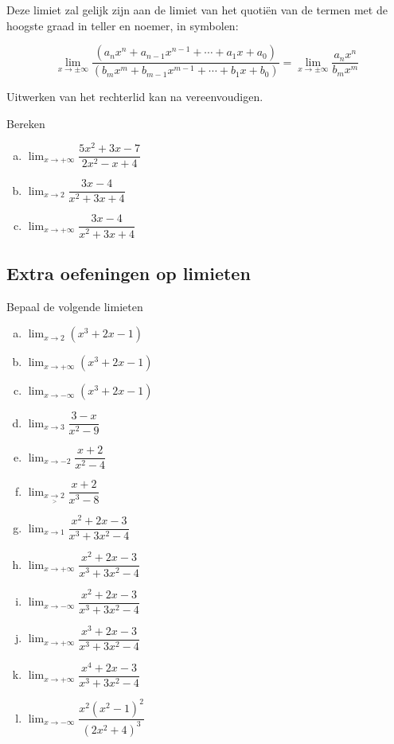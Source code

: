 \documentclass[12pt,twoside,a4paper]{article}
\newenvironment{eigenschap}
{
  \vspace{0.4cm}
  \begin{mdframed}[nobreak=true,frametitle={Eigenschap}]
  }{%
  \end{mdframed}
}
\begin{document}
Deze limiet zal gelijk zijn aan de limiet van het quotiën van de termen met de hoogste graad in teller en noemer, in symbolen:

\begin{eigenschap}
  $$\lim_{x\to \pm\infty}\dfrac{\left(a_nx^n+a_{n-1}x^{n-1}+\cdots+a_1x+a_0\right)}{\left(b_mx^m+b_{m-1}x^{m-1}+\cdots+b_1x+b_0\right)}=\lim_{x\to \pm\infty}\dfrac{a_nx^n}{b_mx^m}$$
\end{eigenschap}

Uitwerken van het rechterlid kan na vereenvoudigen.

\begin{oefening}
  Bereken
  \begin{enumerate}[(a)]
  \itemsep.5em
  \item $\displaystyle\lim_{x\to+\infty}\dfrac{5x^2+3x-7}{2x^2-x+4}$
  \item $\displaystyle\lim_{x\to2}\dfrac{3x-4}{x^2+3x+4}$
  \item $\displaystyle\lim_{x\to+\infty}\dfrac{3x-4}{x^2+3x+4}$
  \end{enumerate}
\end{oefening}

\needspace{3cm}
\subsection{Extra oefeningen op limieten}

\begin{oefening}
  Bepaal de volgende limieten
  \begin{multicols}{3}
  \begin{enumerate}[(a)]
  \itemsep1em
  \item $\displaystyle\lim_{x\to 2}\left(x^3+2x-1\right)$
  \item $\displaystyle\lim_{x\to +\infty}\left(x^3+2x-1\right)$
  \item $\displaystyle\lim_{x\to -\infty}\left(x^3+2x-1\right)$
  \item $\displaystyle\lim_{x\to 3}\dfrac{3-x}{x^2-9}$
  \item $\displaystyle\lim_{x\to -2}\dfrac{x+2}{x^2-4}$
  \item $\displaystyle\lim_{x\underset{>}{\to} 2}\dfrac{x+2}{x^3-8}$
  \item $\displaystyle\lim_{x\to 1}\dfrac{x^2+2x-3}{x^3+3x^2-4}$
  \item $\displaystyle\lim_{x\to +\infty}\dfrac{x^2+2x-3}{x^3+3x^2-4}$
  \item $\displaystyle\lim_{x\to -\infty}\dfrac{x^2+2x-3}{x^3+3x^2-4}$
  \item $\displaystyle\lim_{x\to +\infty}\dfrac{x^3+2x-3}{x^3+3x^2-4}$
  \item $\displaystyle\lim_{x\to +\infty}\dfrac{x^4+2x-3}{x^3+3x^2-4}$
  \item $\displaystyle\lim_{x\to -\infty}\dfrac{x^2(x^2-1)^2}{(2x^2+4)^3}$
  \end{enumerate}
  \end{multicols}
\end{oefening}
\end{document}
